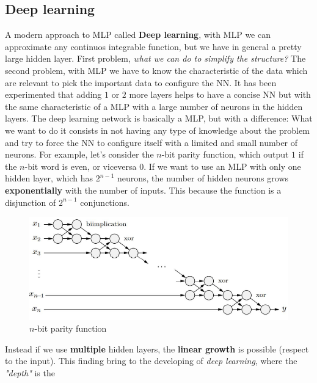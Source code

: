 \documentclass{article}
\begin{document}
\subsection{Deep learning}
A modern approach to MLP called \textbf{Deep learning}, with MLP we can approximate any continuos integrable
function, but we have in general a pretty large hidden layer. First problem, \textit{what we can do to
    simplify the structure?} The second problem, with MLP we have to know the characteristic of the data which are
relevant to pick the important data to configure the NN.
\newline\newline
It has been experimented that adding $1$ or $2$ more layers helps to have a concise NN but with
the same characteristic of a MLP with a large number of neurons in the hidden layers.
\newline\newline
The deep learning network is basically a MLP, but with a difference: What we want to do it consists
in not having any type of knowledge about the problem and try to force the NN to configure itself with
a limited and small number of neurons.
\newline\newline
For example, let's consider the $n$-bit parity function, which output $1$ if the $n$-bit word is even,
or viceversa $0$. If we want to use an MLP with only one hidden layer, which has $2^{n-1}$ neurons, the number
of hidden neurons grows \textbf{exponentially} with the number of inputs. This because the function is a
disjunction of  $2^{n-1}$ conjunctions.
\begin{figure}[H]
    \centering
    \includegraphics[scale=0.5]{images/nbit_parity.png}
    \caption{$n$-bit parity function}
\end{figure}
Instead if we use \textbf{multiple} hidden layers, the \textbf{linear growth} is possible (respect to the
input). This finding bring to the developing of \textit{deep learning}, where the \textit{"depth"} is the
\end{document}

